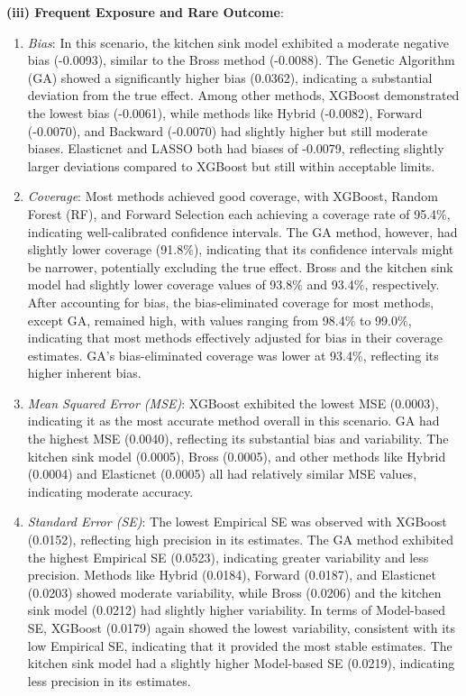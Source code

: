 \documentclass[sn-vancouver,Numbered,lineno,pdflatex]{sn-jnl}
\begin{document}
\textbf{(iii) Frequent Exposure and Rare Outcome}:

\begin{enumerate}
\def\labelenumi{\arabic{enumi}.}
\item
  \emph{Bias}: In this scenario, the kitchen sink model exhibited a
  moderate negative bias (-0.0093), similar to the Bross method
  (-0.0088). The Genetic Algorithm (GA) showed a significantly higher
  bias (0.0362), indicating a substantial deviation from the true
  effect. Among other methods, XGBoost demonstrated the lowest bias
  (-0.0061), while methods like Hybrid (-0.0082), Forward (-0.0070), and
  Backward (-0.0070) had slightly higher but still moderate biases.
  Elasticnet and LASSO both had biases of -0.0079, reflecting slightly
  larger deviations compared to XGBoost but still within acceptable
  limits.
\item
  \emph{Coverage}: Most methods achieved good coverage, with XGBoost,
  Random Forest (RF), and Forward Selection each achieving a coverage
  rate of 95.4\(\%\), indicating well-calibrated confidence intervals.
  The GA method, however, had slightly lower coverage (91.8\(\%\)),
  indicating that its confidence intervals might be narrower,
  potentially excluding the true effect. Bross and the kitchen sink
  model had slightly lower coverage values of 93.8\(\%\) and 93.4\(\%\),
  respectively. After accounting for bias, the bias-eliminated coverage
  for most methods, except GA, remained high, with values ranging from
  98.4\(\%\) to 99.0\(\%\), indicating that most methods effectively
  adjusted for bias in their coverage estimates. GA's bias-eliminated
  coverage was lower at 93.4\(\%\), reflecting its higher inherent bias.
\item
  \emph{Mean Squared Error (MSE)}: XGBoost exhibited the lowest MSE
  (0.0003), indicating it as the most accurate method overall in this
  scenario. GA had the highest MSE (0.0040), reflecting its substantial
  bias and variability. The kitchen sink model (0.0005), Bross (0.0005),
  and other methods like Hybrid (0.0004) and Elasticnet (0.0005) all had
  relatively similar MSE values, indicating moderate accuracy.
\item
  \emph{Standard Error (SE)}: The lowest Empirical SE was observed with
  XGBoost (0.0152), reflecting high precision in its estimates. The GA
  method exhibited the highest Empirical SE (0.0523), indicating greater
  variability and less precision. Methods like Hybrid (0.0184), Forward
  (0.0187), and Elasticnet (0.0203) showed moderate variability, while
  Bross (0.0206) and the kitchen sink model (0.0212) had slightly higher
  variability. In terms of Model-based SE, XGBoost (0.0179) again showed
  the lowest variability, consistent with its low Empirical SE,
  indicating that it provided the most stable estimates. The kitchen
  sink model had a slightly higher Model-based SE (0.0219), indicating
  less precision in its estimates.
\end{enumerate}
\end{document}
